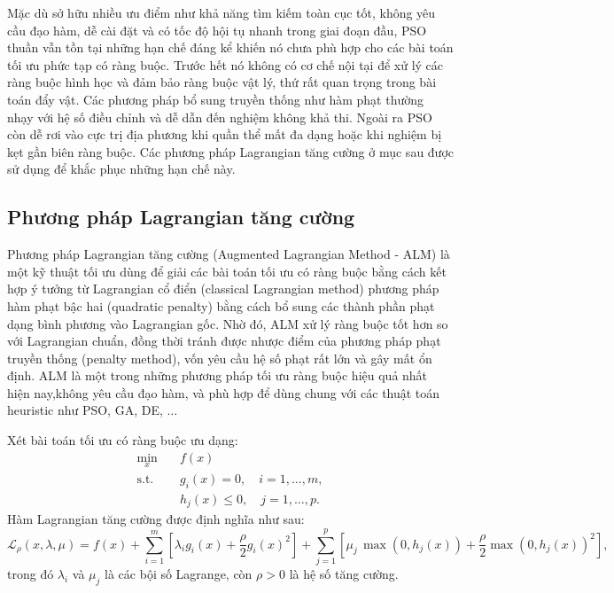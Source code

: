 Mặc dù sở hữu nhiều ưu điểm như khả năng tìm kiếm toàn cục tốt, không yêu cầu đạo hàm, dễ cài đặt và có tốc độ hội tụ nhanh trong giai đoạn đầu, PSO thuần vẫn tồn tại những hạn chế đáng kể khiến nó chưa phù hợp cho các bài toán tối ưu phức tạp có ràng buộc. Trước hết nó không có cơ chế nội tại để xử lý các ràng buộc hình học và đảm bảo ràng buộc vật lý, thứ rất quan trọng trong bài toán đẩy vật. Các phương pháp bổ sung truyền thống như hàm phạt thường nhạy với hệ số điều chỉnh và dễ dẫn đến nghiệm không khả thi. Ngoài ra PSO còn dễ rơi vào cực trị địa phương khi quần thể mất đa dạng hoặc khi nghiệm bị kẹt gần biên ràng buộc. Các phương pháp Lagrangian tăng cường ở mục sau được sử dụng để khắc phục những   hạn chế này. 
\subsection{Phương pháp Lagrangian tăng cường}

Phương pháp Lagrangian tăng cường (Augmented Lagrangian Method - ALM) là một kỹ thuật tối ưu dùng để giải các bài toán tối ưu có ràng buộc bằng cách kết hợp ý tưởng từ Lagrangian cổ điển (classical Lagrangian method) phương pháp hàm phạt bậc hai (quadratic penalty) bằng cách bổ sung các thành phần phạt dạng bình phương vào Lagrangian gốc. Nhờ đó, ALM xử lý ràng buộc tốt hơn so với Lagrangian chuẩn, đồng thời tránh được nhược điểm của phương pháp phạt truyền thống (penalty method), vốn yêu cầu hệ số phạt rất lớn và gây mất ổn định. ALM là một trong những phương pháp tối ưu ràng buộc hiệu quả nhất hiện nay,không yêu cầu đạo hàm, và phù hợp để dùng chung với các thuật toán heuristic như PSO, GA, DE, $\ldots$

Xét bài toán tối ưu có ràng buộc ưu dạng:
\begin{equation}
\begin{aligned}
    \min_{x} \quad & f(x) \\
    \text{s.t.} \quad & g_i(x) = 0, \quad i = 1,\ldots,m, \\
                      & h_j(x) \le 0, \quad j = 1,\ldots,p.
\end{aligned}
\end{equation}
Hàm Lagrangian tăng cường được định nghĩa như sau:
\begin{equation}
    \mathcal{L}_{\rho}(x,\lambda,\mu) = f(x) + \sum_{i=1}^{m} \left[ \lambda_i g_i(x) + \frac{\rho}{2} g_i(x)^2 \right] + \sum_{j=1}^{p} \left[ \mu_j\, \max(0,h_j(x)) + \frac{\rho}{2} \max(0,h_j(x))^2 \right],
\label{eq:al}
\end{equation}
trong đó \(\lambda_i\) và \(\mu_j\) là các bội số Lagrange, còn \(\rho > 0\) là hệ số tăng cường.

